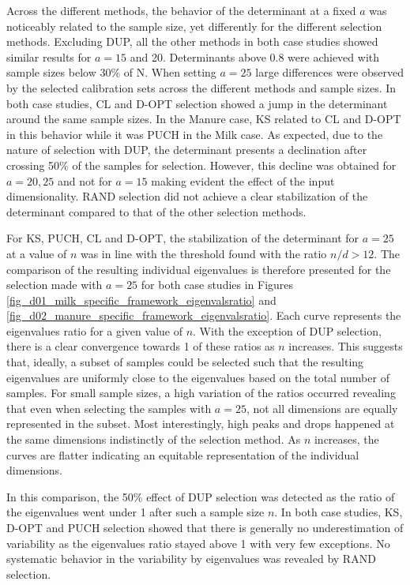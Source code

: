 \documentclass[journal=ancham,manuscript=article]{achemso}
\begin{document}
Across the different methods, the behavior of the determinant at a fixed $a$ was noticeably related to the sample size, yet differently for the different selection methods. Excluding DUP, all the other methods in both case studies showed similar results for $a=15$ and 20. Determinants above 0.8 were achieved with sample sizes below 30\% of N. When setting $a=25$ large differences were observed by the selected calibration sets across the different methods and sample sizes. In both case studies, CL and D-OPT selection showed a jump in the determinant around the same sample sizes. In the Manure case, KS related to CL and D-OPT in this behavior while it was PUCH in the Milk case. As expected, due to the nature of selection with DUP, the determinant presents a declination after crossing 50\% of the samples for selection. However, this decline was obtained for $a=20, 25$ and not for $a=15$ making evident the effect of the input dimensionality. RAND selection did not achieve a clear stabilization of the determinant compared to that of the other selection methods.

For KS, PUCH, CL and D-OPT, the stabilization of the determinant for $a=25$ at a value of $n$ was in line with the threshold found with the ratio $n/d>12$. The comparison of the resulting individual eigenvalues is therefore presented for the selection made with $a = 25$ for both case studies in Figures \ref{fig_d01_milk_specific_framework_eigenvalsratio} and \ref{fig_d02_manure_specific_framework_eigenvalsratio}. Each curve represents the eigenvalues ratio for a given value of $n$. With the exception of DUP selection, there is a clear convergence towards 1 of these ratios as $n$ increases. This suggests that, ideally, a subset of samples could be selected such that the resulting eigenvalues are uniformly close to the eigenvalues based on the total number of samples. For small sample sizes, a high variation of the ratios occurred revealing that even when selecting the samples with $a=25$, not all dimensions are equally represented in the subset. Most interestingly, high peaks and drops happened at the same dimensions indistinctly of the selection method. As $n$ increases, the curves are flatter indicating an equitable representation of the individual dimensions. 

In this comparison, the 50\% effect of DUP selection was detected as the ratio of the eigenvalues went under 1 after such a sample size $n$. In both case studies, KS, D-OPT and PUCH selection showed that there is generally no underestimation of variability as the eigenvalues ratio stayed above 1 with very few exceptions. No systematic behavior in the variability by eigenvalues was revealed by RAND selection. 
\end{document}

